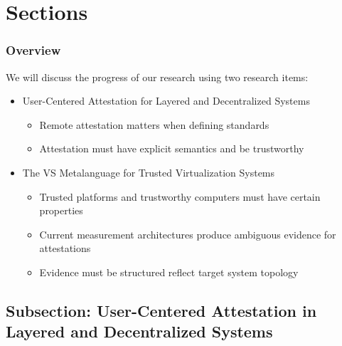 \documentclass[aspectratio=169] {beamer}
\begin{document}
\section{Sections}

\begin{frame}\frametitle{Overview}
	We will discuss the progress of our research using two research items:
	\vfill
	\begin{itemize}
		\item User-Centered Attestation for Layered and Decentralized Systems
		\begin{itemize}
			\item Remote attestation matters when defining standards
			\item Attestation must have explicit semantics and be trustworthy
		\end{itemize}
		\item The VS Metalanguage for Trusted Virtualization Systems
		\begin{itemize}
			\item Trusted platforms and trustworthy computers must have certain properties
			\item Current measurement architectures produce ambiguous evidence for attestations
			\item Evidence must be structured reflect target system topology
		\end{itemize}
	\end{itemize}
\end{frame}

\subsection{Subsection: User-Centered Attestation in Layered and Decentralized Systems}
\end{document}
